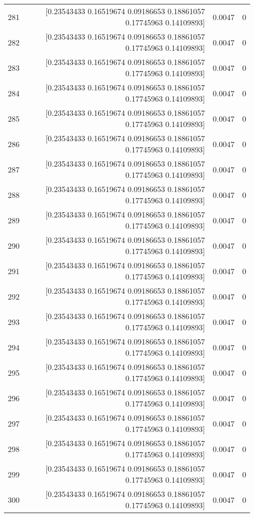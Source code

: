\begin{longtable}{lrrr}
281 & [0.23543433 0.16519674 0.09186653 0.18861057 0.17745963 0.14109893] & 0.0047 & 0 \\
282 & [0.23543433 0.16519674 0.09186653 0.18861057 0.17745963 0.14109893] & 0.0047 & 0 \\
283 & [0.23543433 0.16519674 0.09186653 0.18861057 0.17745963 0.14109893] & 0.0047 & 0 \\
284 & [0.23543433 0.16519674 0.09186653 0.18861057 0.17745963 0.14109893] & 0.0047 & 0 \\
285 & [0.23543433 0.16519674 0.09186653 0.18861057 0.17745963 0.14109893] & 0.0047 & 0 \\
286 & [0.23543433 0.16519674 0.09186653 0.18861057 0.17745963 0.14109893] & 0.0047 & 0 \\
287 & [0.23543433 0.16519674 0.09186653 0.18861057 0.17745963 0.14109893] & 0.0047 & 0 \\
288 & [0.23543433 0.16519674 0.09186653 0.18861057 0.17745963 0.14109893] & 0.0047 & 0 \\
289 & [0.23543433 0.16519674 0.09186653 0.18861057 0.17745963 0.14109893] & 0.0047 & 0 \\
290 & [0.23543433 0.16519674 0.09186653 0.18861057 0.17745963 0.14109893] & 0.0047 & 0 \\
291 & [0.23543433 0.16519674 0.09186653 0.18861057 0.17745963 0.14109893] & 0.0047 & 0 \\
292 & [0.23543433 0.16519674 0.09186653 0.18861057 0.17745963 0.14109893] & 0.0047 & 0 \\
293 & [0.23543433 0.16519674 0.09186653 0.18861057 0.17745963 0.14109893] & 0.0047 & 0 \\
294 & [0.23543433 0.16519674 0.09186653 0.18861057 0.17745963 0.14109893] & 0.0047 & 0 \\
295 & [0.23543433 0.16519674 0.09186653 0.18861057 0.17745963 0.14109893] & 0.0047 & 0 \\
296 & [0.23543433 0.16519674 0.09186653 0.18861057 0.17745963 0.14109893] & 0.0047 & 0 \\
297 & [0.23543433 0.16519674 0.09186653 0.18861057 0.17745963 0.14109893] & 0.0047 & 0 \\
298 & [0.23543433 0.16519674 0.09186653 0.18861057 0.17745963 0.14109893] & 0.0047 & 0 \\
299 & [0.23543433 0.16519674 0.09186653 0.18861057 0.17745963 0.14109893] & 0.0047 & 0 \\
300 & [0.23543433 0.16519674 0.09186653 0.18861057 0.17745963 0.14109893] & 0.0047 & 0 \\

\end{longtable}
